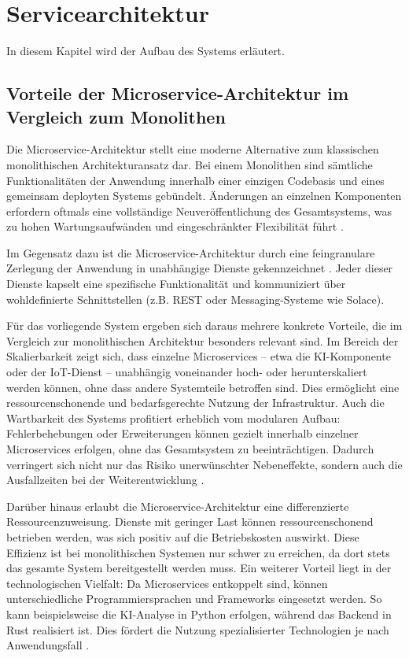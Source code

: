 \section{Servicearchitektur}
In diesem Kapitel wird der Aufbau des Systems erläutert. 

\subsection{Vorteile der Microservice-Architektur im Vergleich zum Monolithen}

Die Microservice-Architektur stellt eine moderne Alternative zum klassischen monolithischen Architekturansatz dar. Bei einem Monolithen sind sämtliche Funktionalitäten der Anwendung innerhalb einer einzigen Codebasis und eines gemeinsam deployten Systems gebündelt. Änderungen an einzelnen Komponenten erfordern oftmals eine vollständige Neuveröffentlichung des Gesamtsystems, was zu hohen Wartungsaufwänden und eingeschränkter Flexibilität führt \cite{newman2021building}.

Im Gegensatz dazu ist die Microservice-Architektur durch eine feingranulare Zerlegung der Anwendung in unabhängige Dienste gekennzeichnet \cite{Dragoni2017}. Jeder dieser Dienste kapselt eine spezifische Funktionalität und kommuniziert über wohldefinierte Schnittstellen (z.B. REST oder Messaging-Systeme wie Solace).

Für das vorliegende System ergeben sich daraus mehrere konkrete Vorteile, die im Vergleich zur monolithischen Architektur besonders relevant sind. Im Bereich der Skalierbarkeit zeigt sich, dass einzelne Microservices – etwa die KI-Komponente oder der IoT-Dienst – unabhängig voneinander hoch- oder herunterskaliert werden können, ohne dass andere Systemteile betroffen sind. Dies ermöglicht eine ressourcenschonende und bedarfsgerechte Nutzung der Infrastruktur. Auch die Wartbarkeit des Systems profitiert erheblich vom modularen Aufbau: Fehlerbehebungen oder Erweiterungen können gezielt innerhalb einzelner Microservices erfolgen, ohne das Gesamtsystem zu beeinträchtigen. Dadurch verringert sich nicht nur das Risiko unerwünschter Nebeneffekte, sondern auch die Ausfallzeiten bei der Weiterentwicklung \cite{newman2021building}.

Darüber hinaus erlaubt die Microservice-Architektur eine differenzierte Ressourcenzuweisung. Dienste mit geringer Last können ressourcenschonend betrieben werden, was sich positiv auf die Betriebskosten auswirkt. Diese Effizienz ist bei monolithischen Systemen nur schwer zu erreichen, da dort stets das gesamte System bereitgestellt werden muss. Ein weiterer Vorteil liegt in der technologischen Vielfalt: Da Microservices entkoppelt sind, können unterschiedliche Programmiersprachen und Frameworks eingesetzt werden. So kann beispielsweise die KI-Analyse in Python erfolgen, während das Backend in Rust realisiert ist. Dies fördert die Nutzung spezialisierter Technologien je nach Anwendungsfall \cite{newman2021building}.

